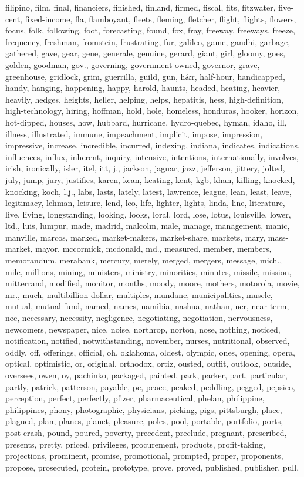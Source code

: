 filipino, film, final, financiers, finished, finland, firmed, fiscal, fits, fitzwater, five-cent, fixed-income, fla, flamboyant, fleets, fleming, fletcher, flight, flights, flowers, focus, folk, following, foot, forecasting, found, fox, fray, freeway, freeways, freeze, frequency, freshman, fromstein, frustrating, fur, galileo, game, gandhi, garbage, gathered, gave, gear, gene, generale, genuine, gerard, giant, girl, gloomy, goes, golden, goodman, gov., governing, government-owned, governor, grave, greenhouse, gridlock, grim, guerrilla, guild, gun, h\&r, half-hour, handicapped, handy, hanging, happening, happy, harold, haunts, headed, heating, heavier, heavily, hedges, heights, heller, helping, helps, hepatitis, hess, high-definition, high-technology, hiring, hoffman, hold, hole, homeless, honduras, hooker, horizon, hot-dipped, houses, how, hubbard, hurricane, hydro-quebec, hyman, idaho, ill, illness, illustrated, immune, impeachment, implicit, impose, impression, impressive, increase, incredible, incurred, indexing, indiana, indicates, indications, influences, influx, inherent, inquiry, intensive, intentions, internationally, involves, irish, ironically, isler, itel, itt, j., jackson, jaguar, jazz, jefferson, jittery, jolted, july, jump, jury, justifies, karen, kean, keating, kent, kgb, khan, killing, knocked, knocking, koch, l.j., labs, lasts, lately, latest, lawrence, league, lean, least, leave, legitimacy, lehman, leisure, lend, leo, life, lighter, lights, linda, line, literature, live, living, longstanding, looking, looks, loral, lord, lose, lotus, louisville, lower, ltd., luis, lumpur, made, madrid, malcolm, male, manage, management, manic, manville, marcos, marked, market-makers, market-share, markets, mary, mass-market, mayor, mccormick, mcdonald, md., measured, member, members, memorandum, merabank, mercury, merely, merged, mergers, message, mich., mile, millions, mining, ministers, ministry, minorities, minutes, missile, mission, mitterrand, modified, monitor, months, moody, moore, mothers, motorola, movie, mr., much, multibillion-dollar, multiples, mundane, municipalities, muscle, mutual, mutual-fund, named, names, namibia, nashua, nathan, ncr, near-term, nec, necessary, necessity, negligence, negotiating, negotiation, nervousness, newcomers, newspaper, nice, noise, northrop, norton, nose, nothing, noticed, notification, notified, notwithstanding, november, nurses, nutritional, observed, oddly, off, offerings, official, oh, oklahoma, oldest, olympic, ones, opening, opera, optical, optimistic, or, original, orthodox, ortiz, ousted, outfit, outlook, outside, oversees, owen, oy, pachinko, packaged, painted, park, parker, part, particular, partly, patrick, patterson, payable, pc, peace, peaked, peddling, pegged, pepsico, perception, perfect, perfectly, pfizer, pharmaceutical, phelan, philippine, philippines, phony, photographic, physicians, picking, pigs, pittsburgh, place, plagued, plan, planes, planet, pleasure, poles, pool, portable, portfolio, ports, post-crash, pound, poured, poverty, precedent, preclude, pregnant, prescribed, presents, pretty, priced, privileges, procurement, products, profit-taking, projections, prominent, promise, promotional, prompted, proper, proponents, propose, prosecuted, protein, prototype, prove, proved, published, publisher, pull, 